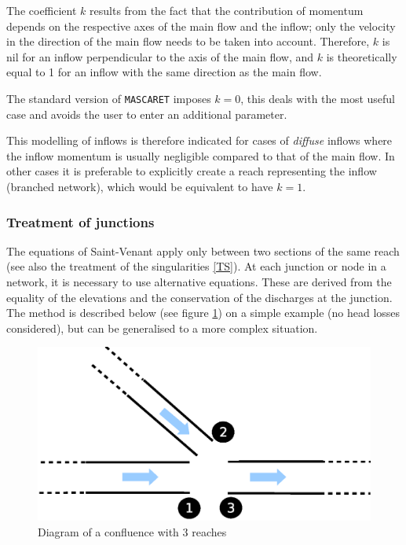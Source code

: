 \vspace{0.5cm}

The coefficient $k$ results from the fact that the contribution of momentum depends on the respective axes of the main flow and the inflow; only the velocity in the direction of the main flow needs to be taken into account. Therefore, $k$ is nil for an inflow perpendicular to the axis of the main flow, 
and $k$ is theoretically equal to 1 for an inflow with the same direction as the main flow.

\vspace{0.5cm}

The standard version of \texttt{MASCARET} imposes $k = 0$, this deals with the most useful case and avoids the user to enter an additional parameter.

\vspace{0.5cm}

This modelling of inflows is therefore indicated for cases of \textit{diffuse} inflows where the inflow momentum is usually negligible compared to that of the main flow. In other cases it is preferable to explicitly create a reach representing the inflow (branched network), which would be equivalent to have $k = 1$.



\subsubsection{Treatment of junctions}
\label{TrNd}

The equations of Saint-Venant apply only between two sections of the same reach (see also the treatment of the singularities \ref{TS}). At each junction or node in a network, it is necessary to use alternative equations. 
These are derived from the equality of the elevations and the conservation of the discharges at the junction. 
The method is described below (see figure \ref{SchemConf}) on a simple example (no head losses considered), but can be generalised to a more complex situation.

\begin{figure}
 \begin{center}
  \includegraphics[scale=0.5]{Figures/Schema_confluent.eps}
  \caption{Diagram of a confluence with 3 reaches}
  \label{SchemConf}
 \end{center}
\end{figure}

